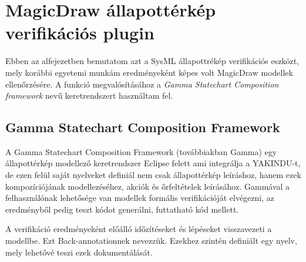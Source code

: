 \section{MagicDraw állapottérkép verifikációs plugin}

Ebben az alfejezetben bemutatom azt a SysML állapottrékép verifikációs eszközt, mely korábbi egyetemi munkám eredményeként képes volt MagicDraw modellek ellenőrzésére. A funkció megvalósításához a \emph{Gamma Statechart Composition framework} nevű keretrendszert használtam fel.

\subsection{Gamma Statechart Composition Framework \cite{DBLP:conf/icse/MolnarGVMV18}}

A Gamma Statechart Composition Framework (továbbiakban Gamma) egy állapottérkép modellező keretrendszer Eclipse felett ami integrálja a YAKINDU-t, de ezen felül saját nyelveket definiál nem csak állapottérkép leíráshoz, hanem ezek kompozíciójának modellezéséhez, akciók és őrfeltételek leírásához. Gammával a felhasználónak lehetősége van modellek formális verifikációját elvégezni, az eredményből pedig teszt kódot generálni, futtatható kód mellett.

A verifikáció eredményeként előálló időzítéseket és lépéseket visszavezeti a modellbe. Ezt Back-annotationnek nevezzük. Ezekhez szintén definiált egy nyelv, mely lehetővé teszi ezek dokumentálását.

